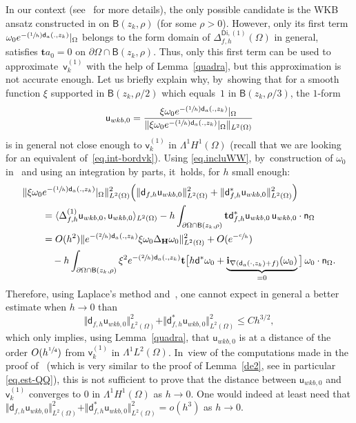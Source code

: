 \documentclass[10pt]{amsart}
\newcommand{\Psfrac}[2]{(\sfrac{#1}{#2})}
\newcommand{\mbf}[1]{\mathbf{#1}}
\theoremstyle{plain}
\theoremstyle{definition}
\begin{document}
In our context (see~\cite[\S1.4]{DoNe2} for more details),
the only possible candidate is the WKB ansatz constructed in
\cite[\S2]{helffer-sjostrand-85}
on $\mathsf B(z_k,\rho)$ (for
some $\rho>0$).
However,
only
its first term $\omega_0e^{-\Psfrac 1h \mathsf d_a(.,z_k)}|_\Omega$
belongs to the form domain of
$\Delta_{f,h}^{\mathsf{Di},(1)}(\Omega)$ in general, \ie satisfies $\mbf t
a_0=0$ on $\partial \Omega\cap \mathsf B(z_k,\rho)$. Thus, only this first term
can be used
to approximate~$\mathsf v_k^{(1)} $ with the help of Lemma~\ref{quadra}, but this approximation
is not accurate enough.
Let us briefly explain why, by~showing that
for a smooth function
$\xi $
supported in $\mathsf B(z_k,\rho/2)$ which equals~$1$ in $\mathsf
B(z_k,\rho/3)$, the $1$-form
\[
\mathsf u_{{wkb,0}}= \frac{\xi \omega_0e^{-\Psfrac 1h \mathsf d_a(.,z_k)}|_\Omega}{\Vert \xi \omega_0e^{-\Psfrac 1h \mathsf d_a(.,z_k)}|_\Omega\Vert_{L^{2}(\Omega)}}
\]
is in general not close enough to $\mathsf v_k^{(1)} $ in $\Lambda^1H^1(\Omega)$ (recall that we are looking for an equivalent of~\eqref{eq.int-bordvk}).
Using \eqref{eq.incluWW}, by~construction of $\omega_0$ in~\cite[Th.\,2.5]{helffer-sjostrand-85} and using an integration by parts, it~holds, for $h$ small enough:
\begin{align*}
\Vert \xi \omega_0&e^{-\Psfrac 1h \mathsf d_a(.,z_k)}|_\Omega\Vert^{2}_{L^{2}(\Omega)}\Bigl(\Vert \mathsf d_{f,h}\mathsf u_{{wkb,0}}\Vert^2_{L^2(\Omega)}+\Vert \mathsf d^*_{f,h}\mathsf u_{{wkb,0}}\Vert^2_{L^2(\Omega)}\Bigr)\\
& = \langle \Delta^{(1)}_{f,h}\mathsf u_{{wkb,0}},\mathsf u_{{wkb,0}}\rangle_{L^2(\Omega)}- h\int_{\partial \Omega\cap \mathsf B(z_k,\rho)} \mbf t \mathsf d_{f,h}^* \mathsf u_{{wkb,0}}\, \mathsf u_{{wkb,0}}\cdot \mathsf n_\Omega\\
&=O(h^2) \Vert e^{-\Psfrac 2h \mathsf d_a(.,z_k)} \xi \omega_0\Delta_{\mbf H}\omega_0 \Vert^2_{L^2(\Omega)} +O(e^{-\sfrac ch})\\
&\quad -h\int_{\partial \Omega\cap \mathsf B(z_k,\rho)} \xi^2 e^{-\Psfrac 2h \mathsf d_a(.,z_k)} \mbf t \big[h\mathsf d^*\omega_0+\underbrace{\mbf i_{ \nabla(\mathsf d_a(\cdot,z_k)+f)}(\omega_0)}_{=0} \big] \, \omega_0\cdot \mathsf n_\Omega.
\end{align*}
Therefore, using Laplace's method and~\cite[Th.\,2.5]{helffer-sjostrand-85}, one cannot expect in general a better estimate
when $h\to0$ than
\[
\Vert \mathsf d_{f,h}\mathsf u_{{wkb,0}}\Vert^2_{L^2(\Omega)}+\Vert \mathsf d^*_{f,h}\mathsf u_{{wkb,0}}\Vert^2_{L^2(\Omega)}\le Ch^{3/2},
\]
which only implies, using Lemma~\ref{quadra}, that $\mathsf u_{{wkb,0}}$ is at a distance of the order $O(h^{\sfrac14})$
from $ \mathsf v_k^{(1)}
$ in $\Lambda^1L^2(\Omega)$. In~view of the computations made in the proof of~\cite[Prop.\,90]{DLLN} (which is very similar to the proof of
Lemma~\ref{de2}, see in particular \eqref{eq.est-QQ}),
this is not sufficient to prove that the distance between
$\mathsf u_{{wkb,0}}$ and $ \mathsf v_k^{(1)}$ converges to $0$
in $\Lambda^1H^1(\Omega)$ as $h\to 0$.
One would indeed
at least need that $ \Vert
\mathsf d_{f,h}\mathsf u_{{wkb,0}}\Vert^2_{L^2(\Omega)}+\Vert
\mathsf d^*_{f,h}\mathsf u_{{wkb,0}}\Vert^2_{L^2(\Omega)}=o(h^{3})$ as
$h\to 0$.
\end{document}
